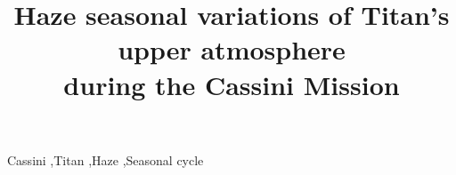 \documentclass[review, authoryear, hidelinks]{elsarticle}
\begin{document}
\begin{frontmatter}
    \title{Haze seasonal variations of Titan's upper atmosphere\\during the Cassini Mission}

    

    \begin{abstract}
        
    \end{abstract}

    \begin{keyword}
    Cassini \sep Titan \sep Haze \sep Seasonal cycle
    \end{keyword}
\end{frontmatter}

\begin{linenumbers}

    
    
    
    
    
    
    

\end{linenumbers}


\end{document}
